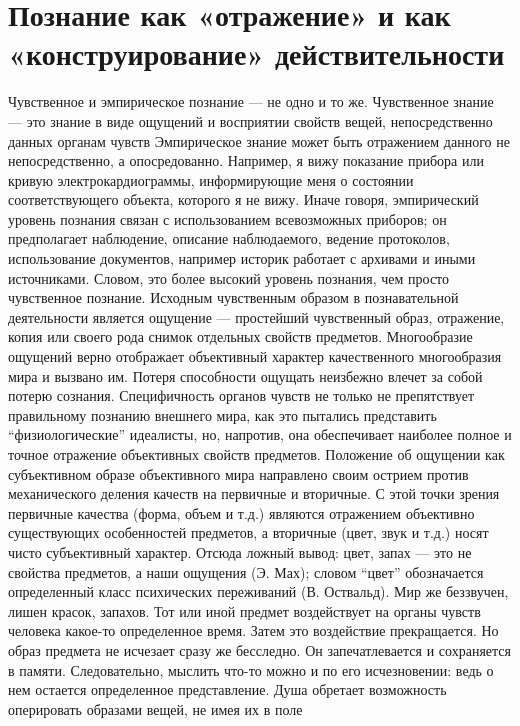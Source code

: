 \documentclass[12pt]{article}
\begin{document}
\newpage
\section{Познание как «отражение» и как «конструирование» действительности}
Чувственное и эмпирическое познание --- не одно и то же. Чувственное знание --- это знание в виде ощущений и
восприятии свойств вещей, непосредственно данных органам чувств
Эмпирическое знание может быть отражением данного не непосредственно, а опосредованно. Например, я
вижу  показание  прибора  или  кривую  электрокардиограммы,  информирующие  меня  о  состоянии
соответствующего  объекта,  которого  я  не  вижу.  Иначе  говоря,  эмпирический  уровень  познания  связан  с
использованием  всевозможных  приборов;  он  предполагает  наблюдение,  описание  наблюдаемого,  ведение
протоколов, использование документов, например историк работает с архивами и иными источниками. Словом,
это более высокий уровень познания, чем просто чувственное познание.
Исходным  чувственным  образом  в  познавательной  деятельности  является  ощущение ---  простейший
чувственный образ, отражение, копия или своего рода снимок отдельных свойств предметов. Многообразие
ощущений верно отображает объективный характер качественного многообразия мира и вызвано им. Потеря
способности ощущать неизбежно влечет за собой потерю сознания.
Специфичность органов чувств не только не препятствует правильному познанию внешнего мира, как это
пытались представить “физиологические” идеалисты, но, напротив, она обеспечивает наиболее полное и точное
отражение объективных свойств предметов.
Положение  об  ощущении  как  субъективном  образе  объективного  мира  направлено  своим  острием  против
механического деления качеств на первичные и вторичные. С этой точки зрения первичные качества (форма,
объем и т.д.) являются отражением объективно существующих особенностей предметов, а вторичные (цвет, звук
и т.д.) носят чисто субъективный характер. Отсюда ложный вывод: цвет, запах --- это не свойства предметов, а
наши ощущения (Э.  Мах);  словом  “цвет” обозначается  определенный  класс психических переживаний  (В.
Оствальд). Мир же беззвучен, лишен красок, запахов.
Тот  или  иной  предмет  воздействует  на  органы  чувств  человека  какое-то  определенное  время.  Затем  это
воздействие  прекращается.  Но  образ  предмета  не  исчезает  сразу  же  бесследно.  Он  запечатлевается  и
сохраняется в памяти. Следовательно, мыслить что-то можно и по его исчезновении: ведь о нем остается
определенное представление. Душа обретает возможность оперировать образами вещей, не имея их в поле
\end{document}
